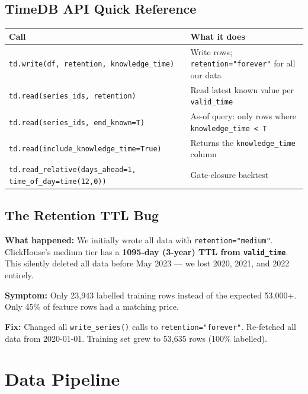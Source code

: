 \documentclass[12pt, a4paper, oneside]{memoir}
\newcommand{\code}[1]{\texttt{\footnotesize #1}}
\begin{document}
\section{TimeDB API Quick Reference}

\begin{center}
\begin{tabularx}{\linewidth}{lX}
\toprule
\textbf{Call} & \textbf{What it does} \\
\midrule
\code{td.write(df, retention, knowledge\_time)} & Write rows; \code{retention="forever"} for all our data \\
\code{td.read(series\_ids, retention)} & Read latest known value per \code{valid\_time} \\
\code{td.read(series\_ids, end\_known=T)} & As-of query: only rows where \code{knowledge\_time < T} \\
\code{td.read(include\_knowledge\_time=True)} & Returns the \code{knowledge\_time} column \\
\code{td.read\_relative(days\_ahead=1, time\_of\_day=time(12,0))} & Gate-closure backtest \\
\bottomrule
\end{tabularx}
\end{center}

\section{The Retention TTL Bug}

\begin{warningbox}
\textbf{What happened:} We initially wrote all data with \code{retention="medium"}.
ClickHouse's medium tier has a \textbf{1095-day (3-year) TTL from \code{valid\_time}}.
This silently deleted all data before May 2023 --- we lost 2020, 2021, and 2022 entirely.

\textbf{Symptom:} Only 23,943 labelled training rows instead of the expected 53,000+.
Only 45\% of feature rows had a matching price.

\textbf{Fix:} Changed all \code{write\_series()} calls to \code{retention="forever"}.
Re-fetched all data from 2020-01-01. Training set grew to 53,635 rows (100\% labelled).
\end{warningbox}

\chapter{Data Pipeline}\label{ch:pipeline}
\end{document}
